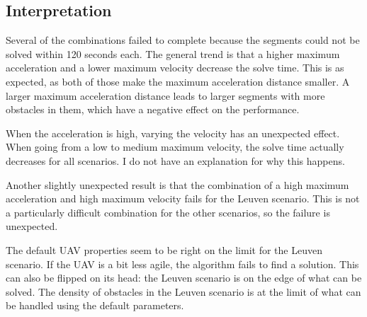 \subsection{Interpretation}
Several of the combinations failed to complete because the segments could not be solved within 120 seconds each. The general trend is that a higher maximum acceleration and a lower maximum velocity decrease the solve time. This is as expected, as both of those make the maximum acceleration distance smaller. A larger maximum acceleration distance leads to larger segments with more obstacles in them, which have a negative effect on the performance. 
\par
When the acceleration is high, varying the velocity has an unexpected effect. When going from a low to medium maximum velocity, the solve time actually decreases for all scenarios. I do not have an explanation for why this happens.
\par
Another slightly unexpected result is that the combination of a high maximum acceleration and high maximum velocity fails for the Leuven scenario. This is not a particularly difficult combination for the other scenarios, so the failure is unexpected.
\par
The default UAV properties seem to be right on the limit for the Leuven scenario. If the UAV is a bit less agile, the algorithm fails to find a solution. This can also be flipped on its head: the Leuven scenario is on the edge of what can be solved. The density of obstacles in the Leuven scenario is at the limit of what can be handled using the default parameters.
